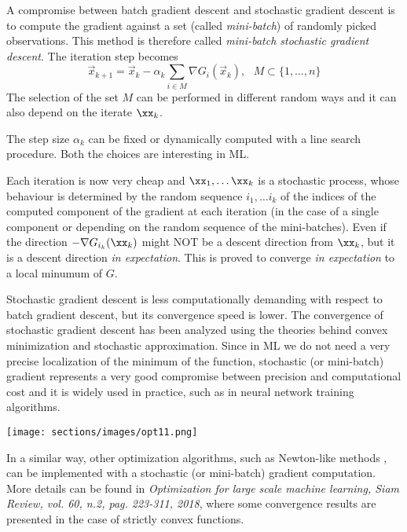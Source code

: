 A compromise between batch gradient descent and stochastic gradient descent is to compute the gradient against a set (called \textit{mini-batch}) of randomly picked observations. This method is therefore called \textit{mini-batch stochastic gradient descent}. The iteration step becomes
$$ \vec{x}_{k+1} = \vec{x}_k - \alpha_k\sum_{i \in M}{\nabla{G_i}(\vec{x}_k)},\ \ \ M \subset \{1, \hdots, n\} $$
The selection of the set $M$ can be performed in different random ways and it can also depend on the iterate $\xx_k$.

The step size $\alpha_k$ can be fixed or dynamically computed with a line search procedure. Both the choices are interesting in ML.

Each iteration is now very cheap and $\xx_1, \ldots \xx_k $ is a stochastic process, whose behaviour is determined by the random sequence $i_1, \ldots i_k$ of the indices of the computed component of the gradient at each iteration (in the case of a single component or depending on the random sequence of the mini-batches).
Even if the direction $-\nabla G_{i_k}(\xx_k)$ might NOT be a descent direction from $\xx_k$, but it is a descent direction \textit{in expectation}. This is proved to converge \textit{in expectation} to a local minumum of $G$.

Stochastic gradient descent is less computationally demanding with respect to batch gradient descent, but its convergence speed is lower. The convergence of stochastic gradient descent has been analyzed using the theories behind convex minimization and stochastic approximation.
Since in ML we do not need a very precise localization of the minimum of the function, stochastic (or mini-batch) gradient represents a very good compromise between precision and computational cost and it is widely used in practice, such as in neural network training algorithms.

\texttt{[image: sections/images/opt11.png]}

In a similar way, other optimization algorithms, such as Newton-like methods , can be implemented with a stochastic (or mini-batch) gradient computation.
More details can be found in \textit{Optimization for large scale machine learning, Siam Review, vol. 60, n.2, pag. 223-311, 2018}, where some convergence results are presented in the case of strictly convex functions.

